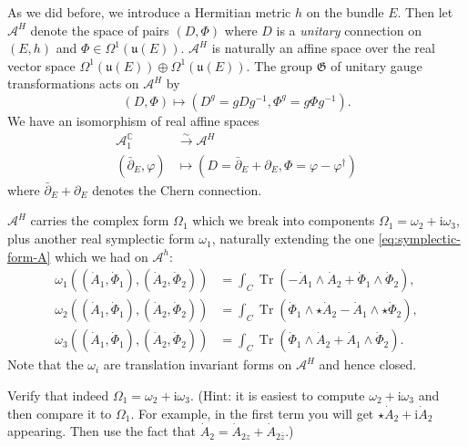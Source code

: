 \documentclass[12pt,letterpaper,reqno]{article}
\numberwithin{equation}{section}
\newcommand{\fu}{{\mathfrak u}}
\newcommand{\fG}{{\mathfrak G}}
\newcommand{\cA}{\ensuremath{\mathcal A}}
\newcommand{\C}{\ensuremath{\mathbb C}}
\newcommand{\I}{{\mathrm i}}
\newcommand{\simarrow}{\xrightarrow\sim}
\newcommand{\ti}[1]{\textit{#1}}
\DeclareMathOperator{\Tr}{Tr}
\begin{document}
As we did before, we introduce a Hermitian metric $h$ on the
bundle $E$.
Then let $\cA^H$ denote the space
of pairs $(D,\Phi)$ where $D$ is a \ti{unitary} connection on $(E,h)$
and $\Phi \in \Omega^1(\fu(E))$.
$\cA^H$ is naturally an affine space over the real vector space
$\Omega^1(\fu(E)) \oplus \Omega^1(\fu(E))$.
The group $\fG$ of unitary gauge transformations
acts on $\cA^H$ by
\begin{equation}
  (D,\Phi) \mapsto (D^g = g D g^{-1}, \Phi^g = g \Phi g^{-1}).
\end{equation}
We have an isomorphism of real affine spaces
\begin{align}
    \cA^\C_1 &\simarrow \cA^H \\
    (\bar\partial_E,\varphi) & \mapsto (D = \bar\partial_E + \partial_E, \Phi = \varphi - \varphi^\dagger)
\end{align}
where $\bar\partial_E + \partial_E$ denotes the Chern connection.

$\cA^H$ carries the complex form $\Omega_1$ which we break into
components $\Omega_1 = \omega_2 + \I \omega_3$, plus another
real symplectic form $\omega_1$, naturally extending the one \eqref{eq:symplectic-form-A} which
we had on $\cA^h$:
\begin{subequations} \label{eq:symplectic-forms-higgs}
\begin{align}
  \omega_1((\dot A_1, \dot \Phi_1),(\dot A_2, \dot \Phi_2)) &= \int_C \Tr(- \dot A_1 \wedge \dot A_2 + \dot \Phi_1 \wedge \dot \Phi_2), \\
  \omega_2((\dot A_1, \dot \Phi_1),(\dot A_2, \dot \Phi_2)) &= \int_C \Tr(\dot \Phi_1 \wedge \star \dot A_2 - \dot A_1 \wedge \star \dot \Phi_2), \\
  \omega_3((\dot A_1, \dot \Phi_1),(\dot A_2, \dot \Phi_2)) &= \int_C \Tr(\dot\Phi_1 \wedge \dot A_2 + \dot A_1 \wedge \dot \Phi_2).
\end{align}
\end{subequations}
Note that the $\omega_i$ are translation invariant forms on $\cA^H$ and hence
closed.

\begin{exercise} Verify that indeed $\Omega_1 = \omega_2 + \I \omega_3$. (Hint: it is
easiest to compute $\omega_2 + \I \omega_3$ and then compare it to $\Omega_1$.
For example, in the first term you will get $\star \dot{A}_2 + \I \dot{A}_2$ appearing.
Then use the fact that $\dot{A}_2 = \dot{A}_{2z} + \dot{A}_{2\bar{z}}$.)
\end{exercise}
\end{document}
